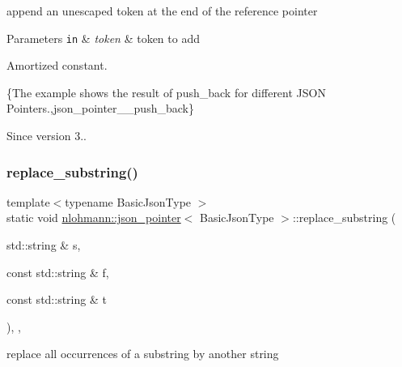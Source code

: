 append an unescaped token at the end of the reference pointer 


\begin{DoxyParams}[1]{Parameters}
\mbox{\tt in}  & {\em token} & token to add\\
\hline
\end{DoxyParams}
Amortized constant.

\{The example shows the result of {\ttfamily push\+\_\+back} for different J\+S\+ON Pointers.,json\+\_\+pointer\+\_\+\+\_\+push\+\_\+back\}

\begin{DoxySince}{Since}
version 3.. 
\end{DoxySince}
\mbox{\label{classnlohmann_1_1json__pointer_aa7649d30da9fc10b0e20704a27aea2a9}} 
\subsubsection{\texorpdfstring{replace\+\_\+substring()}{replace\_substring()}}
{\footnotesize\ttfamily template$<$typename Basic\+Json\+Type $>$ \\
static void \mbox{\hyperlink{classnlohmann_1_1json__pointer}{nlohmann\+::json\+\_\+pointer}}$<$ Basic\+Json\+Type $>$\+::replace\+\_\+substring (\begin{DoxyParamCaption}\item[{std\+::string \&}]{s,  }\item[{const std\+::string \&}]{f,  }\item[{const std\+::string \&}]{t }\end{DoxyParamCaption})\hspace{0.3cm}{\ttfamily [inline]}, {\ttfamily [static]}, {\ttfamily [private]}}



replace all occurrences of a substring by another string 


